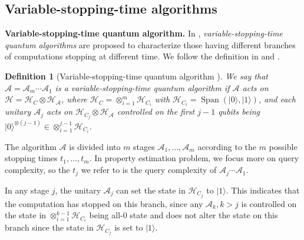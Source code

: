 \documentclass[journal]{IEEEtran}
\newtheorem{definition}{Definition}
\begin{document}
\subsection{Variable-stopping-time algorithms}
\noindent
\textbf{Variable-stopping-time quantum algorithm.}
\label{sec:vtaa} 
In \cite{ambainis2012variable}, \textit{variable-stopping-time quantum algorithms} are proposed to characterize those having different branches of computations stopping at different time. We follow the definition in \cite{childs2017} and \cite{chakraborty2019linear}.
\begin{definition}[Variable-stopping-time quantum algorithm {\cite[Definition 13]{chakraborty2019linear}}]
    We say that $\mathcal{A}=\mathcal{A}_{m} \cdots \mathcal{A}_{1}$ is a variable-stopping-time quantum algorithm if $\mathcal{A}$ acts on $\mathcal{H}=\mathcal{H}_{C} \otimes \mathcal{H}_{\mathcal{A}}$, where $\mathcal{H}_{C}=\otimes_{i=1}^{m} \mathcal{H}_{C_{i}}$ with $\mathcal{H}_{C_{i}}=\operatorname{Span}(|0\rangle,|1\rangle)$, and each unitary $\mathcal{A}_{j}$ acts on $\mathcal{H}_{C_{j}} \otimes \mathcal{H}_{\mathcal{A}}$ controlled on the first $j-1$ qubits being $|0\rangle^{\otimes (j-1)} \in \otimes_{i=1}^{j-1} \mathcal{H}_{C_{i}}$.
\end{definition}
The algorithm $\mathcal{A}$ is divided into $m$ stages $\mathcal{A}_{1},\ldots  ,\mathcal{A}_{m}$ according to the $m$ possible stopping times $t_1,\ldots,t_m$. In property estimation problem, we focus more on query complexity, so the $t_j$ we refer to is the query complexity of $\mathcal{A}_j \cdots \mathcal{A}_{1}$.

In any stage $j$, the unitary $\mathcal{A}_j$ can set the state in $\mathcal{H}_{C_j}$ to $|1\rangle$. This indicates that the computation has stopped on this branch, since any $\mathcal{A}_k,k>j$ is controlled on the state in $\otimes_{i=1}^{k-1} \mathcal{H}_{C_{i}}$ being all-0 state and does not alter the state on this branch since the state in $\mathcal{H}_{C_j}$ is set to $|1\rangle$.
\end{document}

